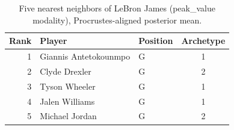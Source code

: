 \begin{table}[htbp]
  \centering\small
  \begin{tabular}{rllc}
    \toprule
    Rank & Player & Position & Archetype \\
    \midrule
    1 & Giannis Antetokounmpo & G & 1 \\
    2 & Clyde Drexler & G & 2 \\
    3 & Tyson Wheeler & G & 1 \\
    4 & Jalen Williams & G & 1 \\
    5 & Michael Jordan & G & 2 \\
    \bottomrule
  \end{tabular}
  \caption{Five nearest neighbors of LeBron James (peak_value modality), Procrustes-aligned posterior mean.}
  \label{tab:LeBron_James_neighbors_peak_value}
\end{table}

